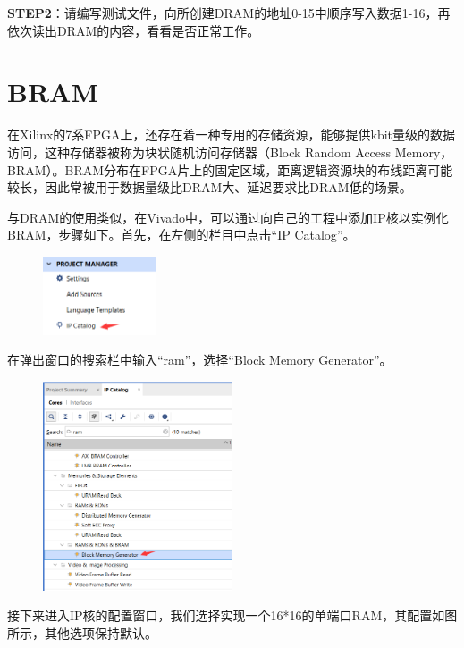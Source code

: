 \documentclass{ctexart}
\begin{document}
\textbf{STEP2}：请编写测试文件，向所创建DRAM的地址0-15中顺序写入数据1-16，再依次读出DRAM的内容，看看是否正常工作。


\section{BRAM}

在Xilinx的7系FPGA上，还存在着一种专用的存储资源，能够提供kbit量级的数据访问，这种存储器被称为块状随机访问存储器（Block Random Access Memory，BRAM）。BRAM分布在FPGA片上的固定区域，距离逻辑资源块的布线距离可能较长，因此常被用于数据量级比DRAM大、延迟要求比DRAM低的场景。

与DRAM的使用类似，在Vivado中，可以通过向自己的工程中添加IP核以实例化BRAM，步骤如下。首先，在左侧的栏目中点击“IP Catalog”。

\begin{figure}[H]
    \centering
    \includegraphics[width=0.3\textwidth]{lab3/4.png}
\end{figure}

在弹出窗口的搜索栏中输入“ram”，选择“Block Memory Generator”。

\begin{figure}[H]
    \centering
    \includegraphics[width=0.5\textwidth]{lab3/9.png}
\end{figure}

接下来进入IP核的配置窗口，我们选择实现一个16*16的单端口RAM，其配置如图所示，其他选项保持默认。
\end{document}
